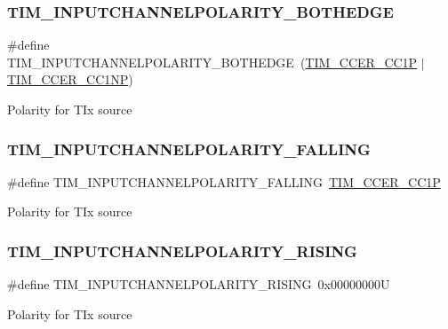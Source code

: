 \subsubsection{\texorpdfstring{TIM\_INPUTCHANNELPOLARITY\_BOTHEDGE}{TIM\_INPUTCHANNELPOLARITY\_BOTHEDGE}}
{\footnotesize\ttfamily \#define T\+I\+M\+\_\+\+I\+N\+P\+U\+T\+C\+H\+A\+N\+N\+E\+L\+P\+O\+L\+A\+R\+I\+T\+Y\+\_\+\+B\+O\+T\+H\+E\+D\+GE~(\mbox{\hyperlink{group___peripheral___registers___bits___definition_ga0ca0aedba14241caff739afb3c3ee291}{T\+I\+M\+\_\+\+C\+C\+E\+R\+\_\+\+C\+C1P}} $\vert$ \mbox{\hyperlink{group___peripheral___registers___bits___definition_ga403fc501d4d8de6cabee6b07acb81a36}{T\+I\+M\+\_\+\+C\+C\+E\+R\+\_\+\+C\+C1\+NP}})}

Polarity for T\+Ix source \mbox{\label{group___t_i_m___input___channel___polarity_ga07441a8c0a52234e30f471c23803450c}} 
\subsubsection{\texorpdfstring{TIM\_INPUTCHANNELPOLARITY\_FALLING}{TIM\_INPUTCHANNELPOLARITY\_FALLING}}
{\footnotesize\ttfamily \#define T\+I\+M\+\_\+\+I\+N\+P\+U\+T\+C\+H\+A\+N\+N\+E\+L\+P\+O\+L\+A\+R\+I\+T\+Y\+\_\+\+F\+A\+L\+L\+I\+NG~\mbox{\hyperlink{group___peripheral___registers___bits___definition_ga0ca0aedba14241caff739afb3c3ee291}{T\+I\+M\+\_\+\+C\+C\+E\+R\+\_\+\+C\+C1P}}}

Polarity for T\+Ix source \mbox{\label{group___t_i_m___input___channel___polarity_ga4f4cede88a4ad4b33e81f2567e9bb08f}} 
\subsubsection{\texorpdfstring{TIM\_INPUTCHANNELPOLARITY\_RISING}{TIM\_INPUTCHANNELPOLARITY\_RISING}}
{\footnotesize\ttfamily \#define T\+I\+M\+\_\+\+I\+N\+P\+U\+T\+C\+H\+A\+N\+N\+E\+L\+P\+O\+L\+A\+R\+I\+T\+Y\+\_\+\+R\+I\+S\+I\+NG~0x00000000U}

Polarity for T\+Ix source 